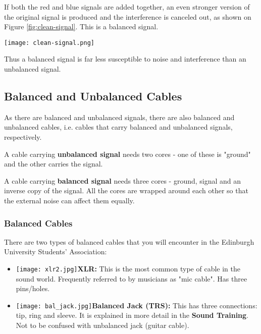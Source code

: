 \documentclass[14pt]{article} %
\let\Oldsubsection\subsection
\renewcommand{\subsection}{\FloatBarrier\Oldsubsection}
\let\Oldsubsubsection\subsubsection
\renewcommand{\subsubsection}{\FloatBarrier\Oldsubsubsection}
\begin{document}
If both the red and blue signals are added together, an even stronger version of the original signal is produced and the interference is canceled out, as shown on Figure \ref{fig:clean-signal}. This is a balanced signal. 

\begin{figure*}[h]
\begin{center}

\texttt{[image: clean-signal.png]}
\caption{An image of the produced stronger clean signal (shown in red) with no interference.}
\label{fig:clean-signal}

\end{center}
\end{figure*}

Thus a balanced signal is far less susceptible to noise and interference than an unbalanced signal.

\subsection{Balanced and Unbalanced Cables}
\label{balanced-unbalanced-cables}
As there are balanced and unbalanced signals, there are also balanced and unbalanced cables, i.e. cables that carry balanced and unbalanced signals, respectively.

A cable carrying \textbf{unbalanced signal} needs two cores - one of these is "ground" and the other carries the signal.

A cable carrying \textbf{balanced signal} needs three cores - ground, signal and an inverse copy of the signal. All the cores are wrapped around each other so that the external noise can affect them equally. 


\subsubsection{Balanced Cables}
\label{balanced-cables} 
There are two types of balanced cables that you will encounter in the Edinburgh University Students' Association:

\begin{itemize}

\item \texttt{[image: xlr2.jpg]}\textbf{XLR:} This is the most common type of cable in the sound world. Frequently referred to by musicians as "mic cable". Has three pins/holes.

\item \texttt{[image: bal\_jack.jpg]}\textbf{Balanced Jack (TRS):} This has three connections: tip, ring and sleeve. It is explained in more detail in the \textbf{Sound Training}. Not to be confused with unbalanced jack (guitar cable).

\end{itemize}
\end{document}
